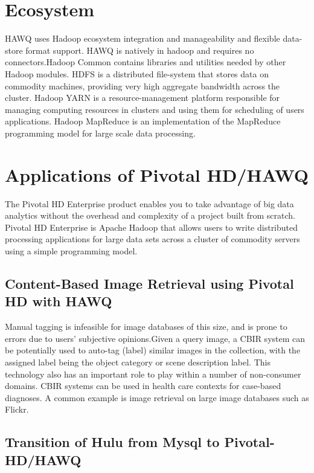 \documentclass[9pt,twocolumn,twoside]{../../styles/osajnl}
\begin{document}
\section{Ecosystem}

HAWQ uses {Hadoop ecosystem}\cite{www-about-hadoop} integration and 
manageability and flexible data-store format support. HAWQ is 
natively in hadoop and requires no connectors.Hadoop Common contains 
libraries and utilities needed by other Hadoop modules. HDFS is a 
distributed file-system that stores data on commodity machines, 
providing very high aggregate bandwidth across the cluster. Hadoop 
YARN is a resource-management platform responsible for managing 
computing resources in clusters and using them for scheduling of 
users applications. Hadoop MapReduce is an implementation of the 
MapReduce programming model for large scale data processing.  

\section{Applications of Pivotal HD/HAWQ}

The Pivotal HD Enterprise product enables you to take advantage of 
big data analytics without the overhead and complexity of a project 
built from scratch. Pivotal HD Enterprise is Apache Hadoop that 
allows users to write distributed processing applications for large 
data sets across a cluster of commodity servers using a simple 
programming model. 

\subsection{Content-Based Image Retrieval using Pivotal HD with HAWQ}

Manual tagging is infeasible for image databases of this size, and is 
prone to errors due to users’ subjective opinions.Given a query 
image, a {CBIR}\cite{www-cbir} system can be potentially used to 
auto-tag (label) 
similar images in the collection, with the assigned label being the 
object category or scene description label. This technology also has 
an important role to play within a number of non-consumer domains. 
CBIR systems can be used in health care contexts for case-based 
diagnoses. A common example is {image retrieval on large image 
databases such as Flickr}\cite{www-paper-cbir}.

\subsection{Transition of Hulu from Mysql to Pivotal-HD/HAWQ}
\end{document}
